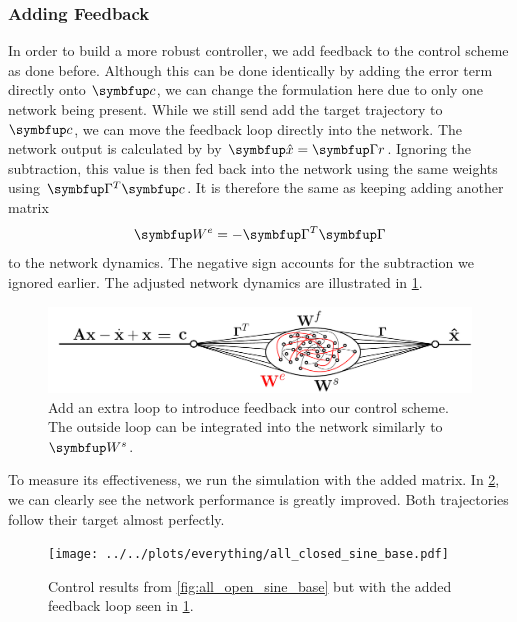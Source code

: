 \subsubsection{Adding Feedback}
In order to build a more robust controller, we add feedback to the control scheme as done before. Although this can be done identically by adding the error term directly onto $\bmu{c}$, we can change the formulation here due to only one network being present.
While we still send add the target trajectory to $\bmu{c}$, we can move the feedback loop directly into the network. The network output is calculated by by $\bmu{\hat{x}} = \bmu{\Gamma r}$. Ignoring the subtraction, this value is then fed back into the network using the same weights using $\bmu{\Gamma}^T\bmu{c}$. It is therefore the same as keeping adding another matrix
\begin{equation}
\bmu{W}^e = -\bmu{\Gamma}^T\bmu{\Gamma}
\end{equation}
to the network dynamics. The negative sign accounts for the subtraction we ignored earlier. The adjusted network dynamics are illustrated in \cref{fig:schematic_feedback_control}.
\begin{figure}
	\centering
	\includegraphics[width=\textwidth]{svg-inkscape/schematic_closed_loop_controller.pdf}
	\caption{Add an extra loop to introduce feedback into our control scheme. The outside loop can be integrated into the network similarly to $\bmu{W}^s$.}
	\label{fig:schematic_feedback_control}
\end{figure}
To measure its effectiveness, we run the simulation with the added matrix. In \cref{fig:all_closed_feedback_extra_loop}, we can clearly see the network performance is greatly improved. Both trajectories follow their target almost perfectly.
\begin{figure}
	\centering
	\texttt{[image: ../../plots/everything/all\_closed\_sine\_base.pdf]}
	\caption{Control results from \cref{fig:all_open_sine_base} but with the added feedback loop seen in \cref{fig:schematic_feedback_control}.}
	\label{fig:all_closed_feedback_extra_loop}
\end{figure}

